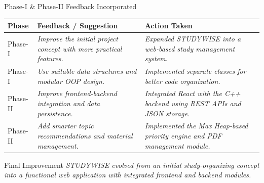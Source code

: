 \documentclass[aspectratio=169,11pt]{beamer}
\newcommand{\placeholder}[1]{%
\textit{\color{GEUGrey}#1}
}
\begin{document}
\begin{frame}{Phase-I \& Phase-II Feedback Incorporated}

\scriptsize

\begin{center}

\renewcommand{\arraystretch}{1.35}

\begin{tabularx}{.96\textwidth}
{@{}p{2.1cm}X X@{}}

\toprule
\textbf{Phase} &
\textbf{Feedback / Suggestion} &
\textbf{Action Taken}\\
\midrule

Phase-I &
\placeholder{ Improve the initial project concept with more practical features.} &
\placeholder{Expanded STUDYWISE into a web-based study management system. }\\

Phase-I &
\placeholder{Use suitable data structures and modular OOP design. } &
\placeholder{Implemented separate classes for better code organization.}\\

Phase-II &
\placeholder{Improve frontend-backend integration and data persistence. } &
\placeholder{Integrated React with the C++ backend using REST APIs and JSON storage.}\\

Phase-II &
\placeholder{Add smarter topic recommendations and material management. } &
\placeholder{Implemented the Max Heap-based priority engine and PDF management module.}\\

\bottomrule

\end{tabularx}

\end{center}

\vfill

\begin{block}{Final Improvement}
\placeholder{
STUDYWISE evolved from an initial study-organizing concept into a functional web application with integrated frontend and backend modules.
}
\end{block}



\end{frame}
\end{document}
